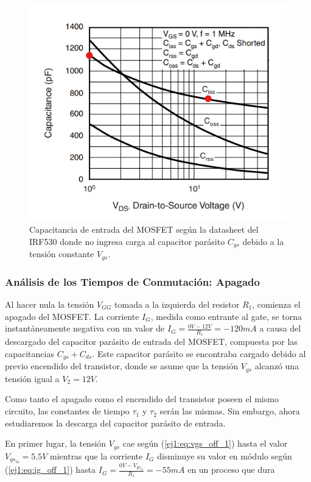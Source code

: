 \begin{figure}[H]
	\centering
	\includegraphics[width=0.8\linewidth]{ImagenesEjercicio-1/Vds-C}
	\caption{Capacitancia de entrada del MOSFET según la datasheet del IRF530 donde no ingresa carga al capacitor parásito $C_{gs}$ debido a la tensión constante $V_{gs}$.}
	\label{ej1:fig:cgd}
\end{figure}

\subsubsection{Análisis de los Tiempos de Conmutación: Apagado}

Al hacer nula la tensión $V_{GG}$ tomada a la izquierda del resistor $R_1$, comienza el apagado del MOSFET. La corriente $I_G$, medida como entrante al gate, se torna instantáneamente negativa con un valor de $I_G = \frac{0V-12V}{R_1} = -120mA$ a causa del descargado del capacitor parásito de entrada del MOSFET, compuesta por las capacitancias $C_{gs} + C_{ds}$. Este capacitor parásito se encontraba cargado debido al previo encendido del transistor, donde se asume que la tensión $V_{gs}$ alcanzó una tensión igual a $V_2 = 12V$.

Como tanto el apagado como el encendido del transistor poseen el mismo circuito, las constantes de tiempo $\tau_1$ y $\tau_2$ serán las mismas. Sin embargo, ahora estudiaremos la descarga del capacitor parásito de entrada.

En primer lugar, la tensión $V_{gs}$ cae según (\ref{ej1:eq:vgs_off_1}) hasta el valor $V_{gs_{io}} = 5.5V$ mientras que la corriente $I_G$ disminuye su valor en módulo según (\ref{ej1:eq:ig_off_1}) hasta $I_G = \frac{0V - V_{gs_{io}}}{R_1} = -55mA$ en un proceso que dura

